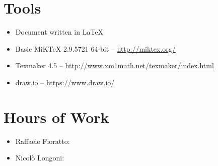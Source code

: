 \newpage
\begin{appendices}
\section{Tools}
\begin{itemize}
	\item Document written in \LaTeX
	\item Basic MiKTeX 2.9.5721 64-bit -- \url{http://miktex.org/}
	\item Texmaker 4.5 -- \url{http://www.xm1math.net/texmaker/index.html}
	\item draw.io -- \url{https://www.draw.io/}
\end{itemize}
\break
\section{Hours of Work}
\begin{itemize}
	\item Raffaele Fioratto: 
	\item Nicol\`{o} Longoni:
\end{itemize}
\end{appendices}